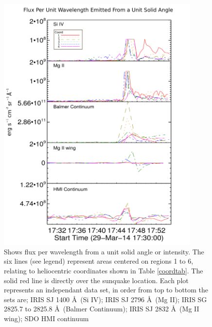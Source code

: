 \begin{figure}[H]
  \begin{center}
  \includegraphics[width=0.9\textwidth]{29-Mar-14-Flux-Ladder}
  \end{center}
  \caption{Shows flux per wavelength from a unit solid angle or intensity. The six lines (see legend) represent areas centered on regions 1 to 6, relating to heliocentric coordinates shown in Table \ref{coordtab}. The solid red line is directly over the sunquake location. Each plot represents an independant data set, in order from top to bottom the sets are; IRIS SJ 1400 \AA\ (Si IV); IRIS SJ 2796 \AA\ (Mg II); IRIS SG  2825.7 to 2825.8 \AA\ (Balmer Continuum); IRIS SJ 2832 \AA\ (Mg II wing); SDO HMI continuum}\label{fluxladder}
\end{figure}




